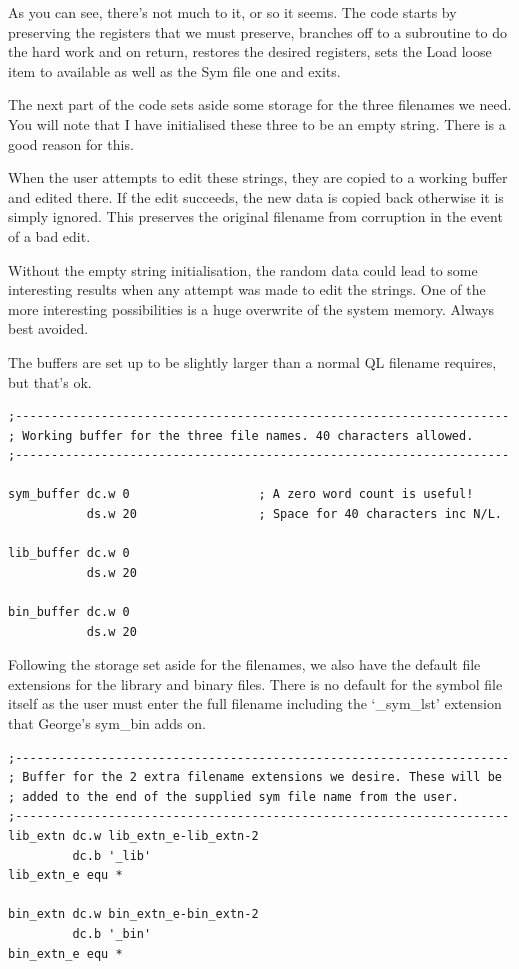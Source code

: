 As you can see, there's not much to it, or so it seems. The code
    starts by preserving the registers that we must preserve, branches off to
    a subroutine to do the hard work and on return, restores the desired
    registers, sets the Load loose item to available as well as the Sym
    file one and exits.

The next part of the code sets aside some storage for the three
    filenames we need. You will note that I have initialised these three to be
    an empty string. There is a good reason for this.

When the user attempts to edit these strings, they are copied to a
    working buffer and edited there. If the edit succeeds, the new data is
    copied back otherwise it is simply ignored. This preserves the original
    filename from corruption in the event of a bad edit.

Without the empty string initialisation, the random data could lead
    to some interesting results when any attempt was made to edit the strings.
    One of the more interesting possibilities is a huge overwrite of the
    system memory. Always best avoided.

The buffers are set up to be slightly larger than a normal QL
    filename requires, but that's ok.

\begin{lstlisting}[firstnumber=last,caption={LibGen\_asm - Buffers}]
;---------------------------------------------------------------------
; Working buffer for the three file names. 40 characters allowed.
;---------------------------------------------------------------------

sym_buffer dc.w 0                  ; A zero word count is useful!
           ds.w 20                 ; Space for 40 characters inc N/L.

lib_buffer dc.w 0
           ds.w 20

bin_buffer dc.w 0
           ds.w 20

\end{lstlisting}

Following the storage set aside for the filenames, we also have the
    default file extensions for the library and binary files. There is no
    default for the symbol file itself as the user must enter the full
    filename including the `\_sym\_lst' extension that George's
 sym\_bin adds on.

\begin{lstlisting}[firstnumber=last,caption={LibGen\_asm - Default File Extensions}]
;---------------------------------------------------------------------
; Buffer for the 2 extra filename extensions we desire. These will be
; added to the end of the supplied sym file name from the user.
;---------------------------------------------------------------------
lib_extn dc.w lib_extn_e-lib_extn-2
         dc.b '_lib'
lib_extn_e equ *

bin_extn dc.w bin_extn_e-bin_extn-2
         dc.b '_bin'
bin_extn_e equ *


\end{lstlisting}

